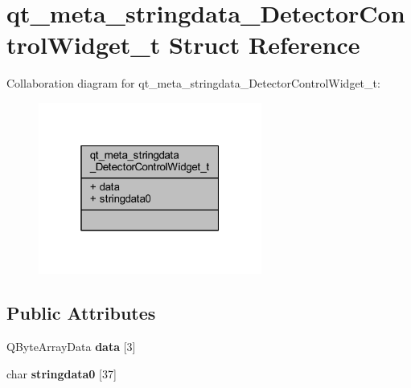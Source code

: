 \hypertarget{structqt__meta__stringdata___detector_control_widget__t}{}\section{qt\+\_\+meta\+\_\+stringdata\+\_\+\+Detector\+Control\+Widget\+\_\+t Struct Reference}
\label{structqt__meta__stringdata___detector_control_widget__t}


Collaboration diagram for qt\+\_\+meta\+\_\+stringdata\+\_\+\+Detector\+Control\+Widget\+\_\+t\+:
\nopagebreak
\begin{figure}[H]
\begin{center}
\leavevmode
\includegraphics[width=208pt]{structqt__meta__stringdata___detector_control_widget__t__coll__graph}
\end{center}
\end{figure}
\subsection*{Public Attributes}
\begin{DoxyCompactItemize}
\item 
\hypertarget{structqt__meta__stringdata___detector_control_widget__t_a50cea206409e1a2f0621da9161a58682}{}Q\+Byte\+Array\+Data {\bfseries data} \mbox{[}3\mbox{]}\label{structqt__meta__stringdata___detector_control_widget__t_a50cea206409e1a2f0621da9161a58682}

\item 
\hypertarget{structqt__meta__stringdata___detector_control_widget__t_a4665d3d34fc43d8289619b3c96952921}{}char {\bfseries stringdata0} \mbox{[}37\mbox{]}\label{structqt__meta__stringdata___detector_control_widget__t_a4665d3d34fc43d8289619b3c96952921}

\end{DoxyCompactItemize}


